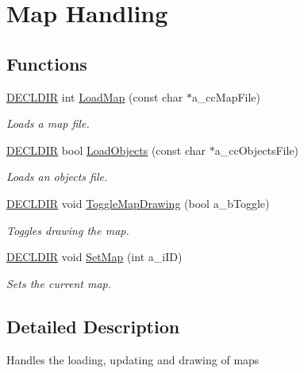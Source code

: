 \hypertarget{group___maps}{\section{Map Handling}
\label{group___maps}
}
\subsection*{Functions}
\begin{DoxyCompactItemize}
\item 
\hyperlink{_framework_8h_a6b6635274dbcf57e29a0140cd8cf0305}{D\-E\-C\-L\-D\-I\-R} int \hyperlink{group___maps_ga1cfdc9ea1e95b0965661830bd9a00a3e}{Load\-Map} (const char $\ast$a\-\_\-cc\-Map\-File)
\begin{DoxyCompactList}\small\item\em Loads a map file. \end{DoxyCompactList}\item 
\hyperlink{_framework_8h_a6b6635274dbcf57e29a0140cd8cf0305}{D\-E\-C\-L\-D\-I\-R} bool \hyperlink{group___maps_gaf876ac2f9d2e1e0157b75530cc1a9be3}{Load\-Objects} (const char $\ast$a\-\_\-cc\-Objects\-File)
\begin{DoxyCompactList}\small\item\em Loads an objects file. \end{DoxyCompactList}\item 
\hyperlink{_framework_8h_a6b6635274dbcf57e29a0140cd8cf0305}{D\-E\-C\-L\-D\-I\-R} void \hyperlink{group___maps_gac5607bacc1c92a6734b25bf0659831a5}{Toggle\-Map\-Drawing} (bool a\-\_\-b\-Toggle)
\begin{DoxyCompactList}\small\item\em Toggles drawing the map. \end{DoxyCompactList}\item 
\hyperlink{_framework_8h_a6b6635274dbcf57e29a0140cd8cf0305}{D\-E\-C\-L\-D\-I\-R} void \hyperlink{group___maps_gaf2460c9946c6572200926dda32f96f0f}{Set\-Map} (int a\-\_\-i\-I\-D)
\begin{DoxyCompactList}\small\item\em Sets the current map. \end{DoxyCompactList}\end{DoxyCompactItemize}


\subsection{Detailed Description}
Handles the loading, updating and drawing of maps 

